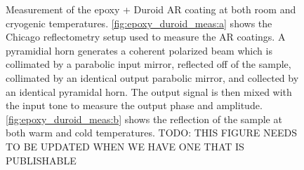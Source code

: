 \begin{figure}
    \caption[Measurement of the epoxy + Duroid AR coating at both room and cryogenic temperatures]{Measurement of the epoxy + Duroid AR coating at both room and cryogenic temperatures. \ref{fig:epoxy_duroid_meas:a} shows the Chicago reflectometry setup used to measure the AR coatings. A pyramidial horn generates a coherent polarized beam which is collimated by a parabolic input mirror, reflected off of the sample, collimated by an identical output parabolic mirror, and collected by an identical pyramidal horn. The output signal is then mixed with the input tone to measure the output phase and amplitude. \ref{fig:epoxy_duroid_meas:b} shows the reflection of the sample at both warm and cold temperatures. TODO: THIS FIGURE NEEDS TO BE UPDATED WHEN WE HAVE ONE THAT IS PUBLISHABLE}
    \label{fig:epoxy_duroid_meas}
\end{figure}

